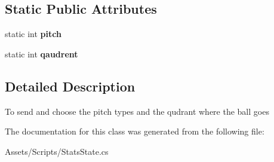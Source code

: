 \subsection*{Static Public Attributes}
\begin{DoxyCompactItemize}
\item 
static int {\bfseries pitch}\hypertarget{class_stats_state_a0299a199eafca794741742a41f85a982}{}\label{class_stats_state_a0299a199eafca794741742a41f85a982}

\item 
static int {\bfseries qaudrent}\hypertarget{class_stats_state_ae40cc7c5c047b79e4d72e975d8248380}{}\label{class_stats_state_ae40cc7c5c047b79e4d72e975d8248380}

\end{DoxyCompactItemize}


\subsection{Detailed Description}
To send and choose the pitch types and the qudrant where the ball goes 



The documentation for this class was generated from the following file\+:\begin{DoxyCompactItemize}
\item 
Assets/\+Scripts/Stats\+State.\+cs\end{DoxyCompactItemize}
